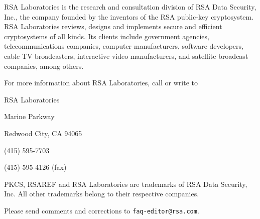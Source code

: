 RSA Laboratories is the research and consultation division of RSA Data
Security, Inc., the company founded by the inventors of the RSA
public-key cryptosystem. RSA Laboratories reviews, designs and
implements secure and efficient cryptosystems of all kinds. Its
clients include government agencies, telecommunications companies,
computer manufacturers, software developers, cable TV broadcasters,
interactive video manufacturers, and satellite broadcast companies,
among others.

For more information about RSA Laboratories, call or write to \par
\noindent \quad\quad\quad\quad RSA Laboratories \par
\noindent \quad\quad\quad{} Marine Parkway \par
\noindent \quad\quad\quad\quad Redwood City, CA 94065 \par
\noindent \quad\quad\quad\quad (415) 595-7703 \par
\noindent \quad\quad\quad\quad (415) 595-4126 (fax) \par

\bigskip
PKCS, RSAREF and RSA Laboratories are trademarks of RSA Data
Security, Inc. All other trademarks belong to their respective 
companies.

\bigskip
Please send comments and corrections to \verb+faq-editor@rsa.com+.


